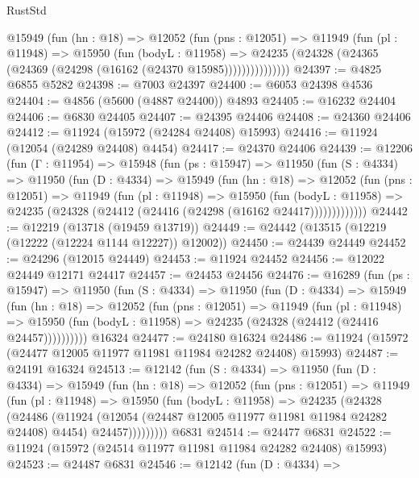 \begin{lexlean}{RustStd}
\begin{coremodule}
            @15949
              (fun (hn : @18) =>
              @12052
                (fun (pns : @12051) =>
                @11949
                  (fun (pl : @11948) =>
                  @15950
                    (fun (bodyL : @11958) =>
                    @24235 (@24328 (@24365 (@24369 (@24298 (@16162 (@24370 @15985)))))))))))))))
@24397 := @4825 @6855 @5282
@24398 := @7003 @24397
@24400 := @6053 @24398 @4536
@24404 := @4856 (@5600 (@4887 @24400)) @4893
@24405 := @16232 @24404
@24406 := @6830 @24405
@24407 := @24395 @24406
@24408 := @24360 @24406
@24412 := @11924 (@15972 (@24284 @24408) @15993)
@24416 := @11924 (@12054 (@24289 @24408) @4454)
@24417 := @24370 @24406
@24439 := @12206
    (fun (Γ : @11954) =>
    @15948
      (fun (ps : @15947) =>
      @11950
        (fun (S : @4334) =>
        @11950
          (fun (D : @4334) =>
          @15949
            (fun (hn : @18) =>
            @12052
              (fun (pns : @12051) =>
              @11949
                (fun (pl : @11948) =>
                @15950
                  (fun (bodyL : @11958) =>
                  @24235 (@24328 (@24412 (@24416 (@24298 (@16162 @24417)))))))))))))
@24442 := @12219 (@13718 (@19459 @13719))
@24449 := @24442 (@13515 (@12219 (@12222 (@12224 @1144 @12227)) @12002))
@24450 := @24439 @24449
@24452 := @24296 (@12015 @24449)
@24453 := @11924 @24452
@24456 := @12022 @24449 @12171 @24417
@24457 := @24453 @24456
@24476 := @16289
    (fun (ps : @15947) =>
    @11950
      (fun (S : @4334) =>
      @11950
        (fun (D : @4334) =>
        @15949
          (fun (hn : @18) =>
          @12052
            (fun (pns : @12051) =>
            @11949
              (fun (pl : @11948) =>
              @15950 (fun (bodyL : @11958) => @24235 (@24328 (@24412 (@24416 @24457))))))))))
    @16324
@24477 := @24180 @16324
@24486 := @11924 (@15972 (@24477 @12005 @11977 @11981 @11984 @24282 @24408) @15993)
@24487 := @24191 @16324
@24513 := @12142
    (fun (S : @4334) =>
    @11950
      (fun (D : @4334) =>
      @15949
        (fun (hn : @18) =>
        @12052
          (fun (pns : @12051) =>
          @11949
            (fun (pl : @11948) =>
            @15950
              (fun (bodyL : @11958) =>
              @24235
                (@24328
                  (@24486
                    (@11924
                      (@12054 (@24487 @12005 @11977 @11981 @11984 @24282 @24408) @4454)
                      @24457)))))))))
    @6831
@24514 := @24477 @6831
@24522 := @11924 (@15972 (@24514 @11977 @11981 @11984 @24282 @24408) @15993)
@24523 := @24487 @6831
@24546 := @12142
    (fun (D : @4334) =>

\end{coremodule}
\end{lexlean}

